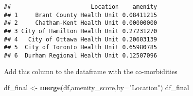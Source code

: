 \documentclass[]{article}
\newenvironment{Shaded}{\begin{snugshade}}{\end{snugshade}}
\newcommand{\DataTypeTok}[1]{\textcolor[rgb]{0.13,0.29,0.53}{#1}}
\newcommand{\KeywordTok}[1]{\textcolor[rgb]{0.13,0.29,0.53}{\textbf{#1}}}
\newcommand{\NormalTok}[1]{#1}
\newcommand{\StringTok}[1]{\textcolor[rgb]{0.31,0.60,0.02}{#1}}
\begin{document}
\begin{verbatim}
##                       Location    amenity
## 1     Brant County Health Unit 0.08411215
## 2     Chatham-Kent Health Unit 0.00000000
## 3 City of Hamilton Health Unit 0.27231270
## 4   City of Ottawa Health Unit 0.20603139
## 5  City of Toronto Health Unit 0.65980785
## 6  Durham Regional Health Unit 0.12507096
\end{verbatim}

Add this column to the dataframe with the co-morbidities

\begin{Shaded}
\begin{Highlighting}[]
\NormalTok{df\_final \textless{}{-}}\StringTok{ }\KeywordTok{merge}\NormalTok{(df,amenity\_score,}\DataTypeTok{by=}\StringTok{"Location"}\NormalTok{)}
\NormalTok{df\_final}
\end{Highlighting}
\end{Shaded}
\end{document}
